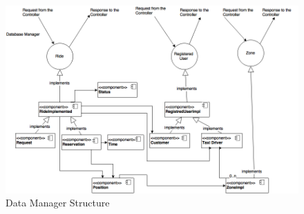 \documentclass[../../../../../../dd.tex]{subfiles}
\begin{document}
	
	\begin{figure}[H]
				\centering
				\includegraphics[width=\textwidth, scale=0.5]{../images/DataTier.png}
			\caption{Data Manager Structure}\label{fig:DBMS}
		\end{figure}
	
	
	 
\end{document}
